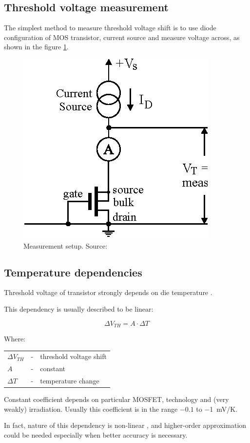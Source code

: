     \subsection{Threshold voltage measurement}
        The simplest method to measure threshold voltage shift is to use diode configuration of MOS transistor, current source and measure voltage across, as shown in the figure \ref{MOS_measurement_setup}.

        \begin{figure}[H]
            \centering
            \includegraphics[width=0.5\paperwidth]{img/03/Vth-measurement-setup.eps}
            \caption{Measurement setup. Source: \cite{pMOS_dosimeters_radfets}}
            \label{MOS_measurement_setup}
        \end{figure}

   \newpage
    \subsection{Temperature dependencies}
        Threshold voltage of transistor strongly depends on die temperature \cite{managing_temperature_effects_in_nanoscale_adaptive_systems}.

        This dependency is usually described to be linear:

        $$\Delta V_{TH} = A \cdot \Delta T$$

        Where:

        \begin{tabular}{lcl}
            $\Delta V_{TH}$ & - & threshold voltage shift \\
            $A$ & - & constant \\
            $\Delta T$ & - & temperature change \\
        \end{tabular}
        \bigskip

        Constant coefficient depends on particular MOSFET, technology and (very weakly) irradiation. Usually this coefficient is in the range $-0.1$ to \SI{-1}{\milli\volt/\kelvin}. 
        
        In fact, nature of this dependency is non-linear \cite{managing_temperature_effects_in_nanoscale_adaptive_systems}, and higher-order approximation could be needed especially when better accuracy is necessary.
